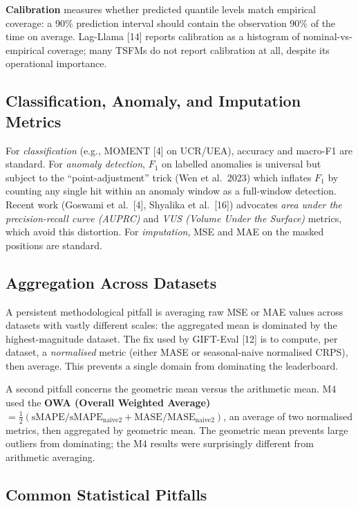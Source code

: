 \documentclass{article}
\begin{document}
\textbf{Calibration} measures whether predicted quantile levels match empirical coverage: a 90\% prediction interval should contain the observation 90\% of the time on average. Lag-Llama {[}14{]} reports calibration as a histogram of nominal-vs-empirical coverage; many TSFMs do not report calibration at all, despite its operational importance.

\subsection{Classification, Anomaly, and Imputation Metrics}\label{classification-anomaly-and-imputation-metrics}

For \emph{classification} (e.g., MOMENT {[}4{]} on UCR/UEA), accuracy and macro-F1 are standard. For \emph{anomaly detection}, \(F_1\) on labelled anomalies is universal but subject to the ``point-adjustment'' trick (Wen et al.~2023) which inflates \(F_1\) by counting any single hit within an anomaly window as a full-window detection. Recent work (Goswami et al.~{[}4{]}, Shyalika et al.~{[}16{]}) advocates \emph{area under the precision-recall curve (AUPRC)} and \emph{VUS (Volume Under the Surface)} metrics, which avoid this distortion. For \emph{imputation}, MSE and MAE on the masked positions are standard.

\subsection{Aggregation Across Datasets}\label{aggregation-across-datasets}

A persistent methodological pitfall is averaging raw MSE or MAE values across datasets with vastly different scales: the aggregated mean is dominated by the highest-magnitude dataset. The fix used by GIFT-Eval {[}12{]} is to compute, per dataset, a \emph{normalised} metric (either MASE or seasonal-naive normalised CRPS), then average. This prevents a single domain from dominating the leaderboard.

A second pitfall concerns the geometric mean versus the arithmetic mean. M4 used the \textbf{OWA (Overall Weighted Average)} \(= \frac{1}{2}(\mathrm{sMAPE}/\mathrm{sMAPE}_{\mathrm{naive2}} + \mathrm{MASE}/\mathrm{MASE}_{\mathrm{naive2}})\), an average of two normalised metrics, then aggregated by geometric mean. The geometric mean prevents large outliers from dominating; the M4 results were surprisingly different from arithmetic averaging.

\subsection{Common Statistical Pitfalls}\label{common-statistical-pitfalls}
\end{document}
